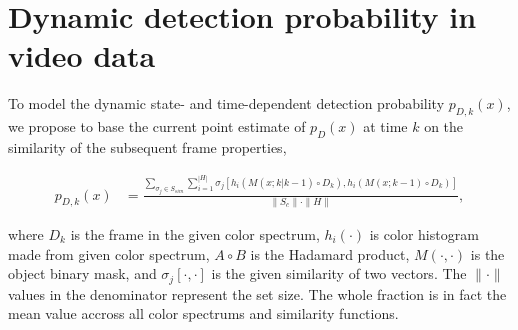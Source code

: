 \begin{figure}
  \centering
  \label{fig:GroundedSAM}
\end{figure}



\section{Dynamic detection probability in video data}
\label{sec:dynamic_pd}
To model the dynamic state- and time-dependent detection probability $p_{D,k}(x)$, we propose to base the current
point estimate of $p_{D}(x)$ at time $k$ on the similarity of the subsequent frame properties,

  \begin{align}
    p_{D,k}(x) &= \frac{\sum_{\sigma_j \in S_{sim}} \sum_{i=1}^{|H|}
      \sigma_j\left[h_i\left(M(x; k|k-1) \!\circ\! D_k\right),
        h_i\left(M(x; k-1) \!\circ\! D_k\right)\right]}{\|S_c\| \cdot \|H\|}, \label{eq:similarity}
  \end{align}

where $D_k$ is the frame in the given color spectrum, $h_i(\cdot)$ is color histogram made from given color spectrum, $A\circ B$ is the Hadamard product, $M(\cdot, \cdot)$ is the object binary mask, and $\sigma_j[\cdot, \cdot]$ is the given similarity of two vectors. The $\|\cdot\|$ values in the denominator represent the set size. The whole fraction is in fact the mean value accross all color spectrums and similarity functions.

